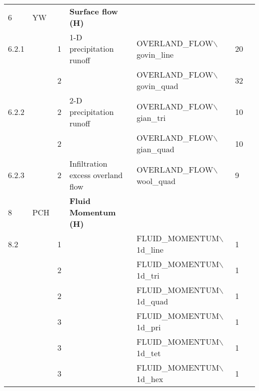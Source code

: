 \begin{landscape}
\begin{center}
\begin{tabularx}{\linewidth}{lllXXll}
6&YW&&\textbf{Surface flow (H)}&&&\\
6.2.1&&1&               1-D precipitation runoff&       OVERLAND\_FLOW$\backslash$govin\_line&20&\\
                 &&2&                           &       OVERLAND\_FLOW$\backslash$govin\_quad&32&\\
6.2.2&&2&       2-D precipitation runoff  &     OVERLAND\_FLOW$\backslash$gian\_tri&10&\\
                 &&2&                                                                                                     &     OVERLAND\_FLOW$\backslash$gian\_quad&10&\\
6.2.3&&2&       Infiltration excess overland flow& OVERLAND\_FLOW$\backslash$wool\_quad&9&\\
\midrule

8&PCH&&\textbf{Fluid Momentum (H)} &&&\\
8.2&&           1&&             FLUID\_MOMENTUM$\backslash$1d\_line&1&\\
&&                      2&&             FLUID\_MOMENTUM$\backslash$1d\_tri&1&\\
&&                      2&&             FLUID\_MOMENTUM$\backslash$1d\_quad&1&\\
&&                      3&&             FLUID\_MOMENTUM$\backslash$1d\_pri&1&\\
&&                      3&&             FLUID\_MOMENTUM$\backslash$1d\_tet&1&\\
&&                      3&&             FLUID\_MOMENTUM$\backslash$1d\_hex&1&\\

\midrule


\end{tabularx}
\end{center}
\end{landscape}

